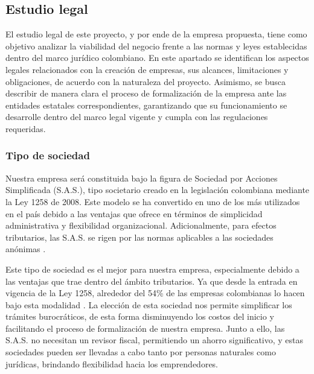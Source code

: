 {}
\subsection*{Estudio legal}


El estudio legal de este proyecto, y por ende de la empresa propuesta, tiene como objetivo analizar la viabilidad del negocio frente a las normas y leyes establecidas dentro del marco jurídico colombiano. En este apartado se identifican los aspectos legales relacionados con la creación de empresas, sus alcances, limitaciones y obligaciones, de acuerdo con la naturaleza del proyecto. Asimismo, se busca describir de manera clara el proceso de formalización de la empresa ante las entidades estatales correspondientes, garantizando que su funcionamiento se desarrolle dentro del marco legal vigente y cumpla con las regulaciones requeridas.

{}
\subsubsection*{Tipo de sociedad}


Nuestra empresa será constituida bajo la figura de Sociedad por Acciones Simplificada (S.A.S.), tipo societario creado en la legislación colombiana mediante la Ley 1258 de 2008. Este modelo se ha convertido en uno de los más utilizados en el país debido a las ventajas que ofrece en términos de simplicidad administrativa y flexibilidad organizacional. Adicionalmente, para efectos tributarios, las S.A.S. se rigen por las normas aplicables a las sociedades anónimas \parencite{Ley1258}.

Este tipo de sociedad es el mejor para nuestra empresa, especialmente debido a las ventajas que trae dentro del ámbito tributarios. Ya que desde la entrada en vigencia de la Ley 1258, alrededor del 54\% de las empresas colombianas lo hacen bajo esta modalidad \parencite{Actualicese01}. La elección de esta sociedad nos permite simplificar los trámites burocráticos, de esta forma disminuyendo los costos del inicio y facilitando el proceso de formalización de nuestra empresa. Junto a ello, las S.A.S. no necesitan un revisor fiscal, permitiendo un ahorro significativo, y estas sociedades pueden ser llevadas a cabo tanto por personas naturales como jurídicas, brindando flexibilidad hacia los emprendedores.

{}
